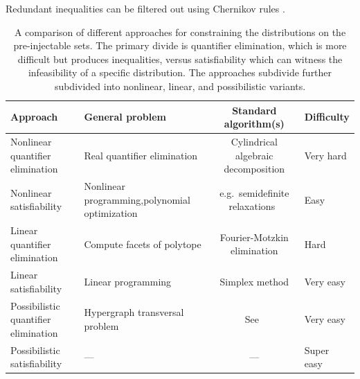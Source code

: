 Redundant inequalities can be filtered out using Chernikov rules \cite{Shapot2012,Bastrakov2015}. 

\begin{table}[ht]\centering\caption{A comparison of different approaches for constraining the distributions on the pre-injectable sets. The primary divide is quantifier elimination, which is more difficult but produces inequalities, versus satisfiability which can witness the infeasibility of a specific distribution. The approaches subdivide further subdivided into nonlinear, linear, and possibilistic variants.}
\begin{tabularx}{\linewidth}{ |l|L|c|L| } 
\hline
Approach & General problem & Standard algorithm(s) & Difficulty \\
\bottomrule
Nonlinear quantifier elimination & Real quantifier elimination & Cylindrical algebraic decomposition & Very hard \\
\hline
Nonlinear satisfiability & Nonlinear programming,\newline polynomial optimization & e.g.~semidefinite relaxations~\cite{laurent_polynomial_2012} & Easy \\
\hline
Linear quantifier elimination & Compute facets of polytope & Fourier-Motzkin elimination & Hard \\
\hline
Linear satisfiability & Linear programming & Simplex method & Very easy \\
\hline
Possibilistic quantifier elimination & Hypergraph transversal problem & See~\citet{eiter_dualization_2008} & Very easy \\
\hline 
Possibilistic satisfiability & --- & --- & Super easy
\\\toprule
\end{tabularx}
\end{table}



